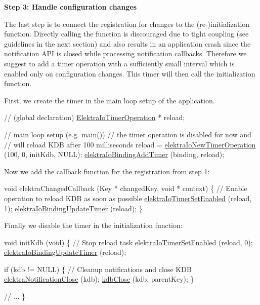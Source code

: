 {\bfseries Step 3\+: Handle configuration changes}

The last step is to connect the registration for changes to the (re-\/)initialization function. Directly calling the function is discouraged due to tight coupling (see guidelines in the next section) and also results in an application crash since the notification A\+PI is closed while processing notification callbacks. Therefore we suggest to add a timer operation with a sufficiently small interval which is enabled only on configuration changes. This timer will then call the initialization function.

First, we create the timer in the main loop setup of the application.


\begin{DoxyCode}
\textcolor{comment}{// (global declaration)}
\hyperlink{kdbio_8h_a09c40c890207a8244fc39bb930fee1fa}{ElektraIoTimerOperation} * reload;

\textcolor{comment}{// main loop setup (e.g. main())}
\textcolor{comment}{// the timer operation is disabled for now and}
\textcolor{comment}{// will reload KDB after 100 milliseconds}
reload = \hyperlink{io_8c_a67a0a81d263e0a7853809144c4ea5198}{elektraIoNewTimerOperation} (100, 0, initKdb, NULL);
\hyperlink{io_8c_a1d61dca5ec35900c33224d82711c0bdb}{elektraIoBindingAddTimer} (binding, reload);
\end{DoxyCode}


Now we add the callback function for the registration from step 1\+:


\begin{DoxyCode}
\textcolor{keywordtype}{void} elektraChangedCallback (Key * changedKey, \textcolor{keywordtype}{void} * context)
\{
        \textcolor{comment}{// Enable operation to reload KDB as soon as possible}
        \hyperlink{io_8c_a301cebc4da212bdb3aac0ad84f70ad85}{elektraIoTimerSetEnabled} (reload, 1);
        \hyperlink{io_8c_add5679a2ff842d88435938d629497e27}{elektraIoBindingUpdateTimer} (reload);
\}
\end{DoxyCode}


Finally we disable the timer in the initialization function\+:


\begin{DoxyCode}
\textcolor{keywordtype}{void} initKdb (\textcolor{keywordtype}{void})
\{
        \textcolor{comment}{// Stop reload task}
        \hyperlink{io_8c_a301cebc4da212bdb3aac0ad84f70ad85}{elektraIoTimerSetEnabled} (reload, 0);
        \hyperlink{io_8c_add5679a2ff842d88435938d629497e27}{elektraIoBindingUpdateTimer} (reload);

        \textcolor{keywordflow}{if} (kdb != NULL)
        \{
                \textcolor{comment}{// Cleanup notifications and close KDB}
                \hyperlink{group__kdbnotification_ga5685dafbd4131011365628d6d9213594}{elektraNotificationClose} (kdb);
                \hyperlink{group__kdb_gadb54dc9fda17ee07deb9444df745c96f}{kdbClose} (kdb, parentKey);
        \}

        \textcolor{comment}{// ...}
\}
\end{DoxyCode}


